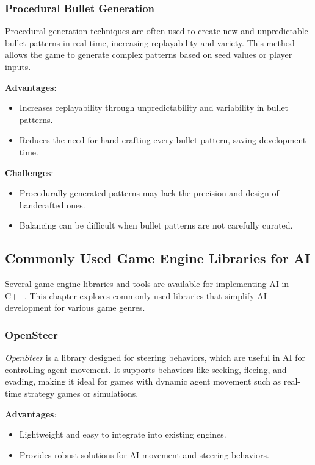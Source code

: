 \subsubsection{Procedural Bullet Generation}

Procedural generation techniques are often used to create new and unpredictable bullet patterns in real-time, increasing replayability and variety. This method allows the game to generate complex patterns based on seed values or player inputs.

\textbf{Advantages}:
\begin{itemize}
    \item Increases replayability through unpredictability and variability in bullet patterns.
    \item Reduces the need for hand-crafting every bullet pattern, saving development time.
\end{itemize}

\textbf{Challenges}:
\begin{itemize}
    \item Procedurally generated patterns may lack the precision and design of handcrafted ones.
    \item Balancing can be difficult when bullet patterns are not carefully curated.
\end{itemize}

\subsection{Commonly Used Game Engine Libraries for AI}

Several game engine libraries and tools are available for implementing AI in C++. This chapter explores commonly used libraries that simplify AI development for various game genres.

\subsubsection{OpenSteer}

\textit{OpenSteer} is a library designed for steering behaviors, which are useful in AI for controlling agent movement. It supports behaviors like seeking, fleeing, and evading, making it ideal for games with dynamic agent movement such as real-time strategy games or simulations.

\textbf{Advantages}:
\begin{itemize}
    \item Lightweight and easy to integrate into existing engines.
    \item Provides robust solutions for AI movement and steering behaviors.
\end{itemize}


